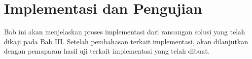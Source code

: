 \chapter{Implementasi dan Pengujian}
Bab ini akan menjelaskan proses implementasi dari rancangan solusi yang telah dikaji pada Bab III\@. 
Setelah pembahasan terkait implementasi, akan dilanjutkan dengan pemaparan hasil uji terkait implementasi yang telah dibuat.





